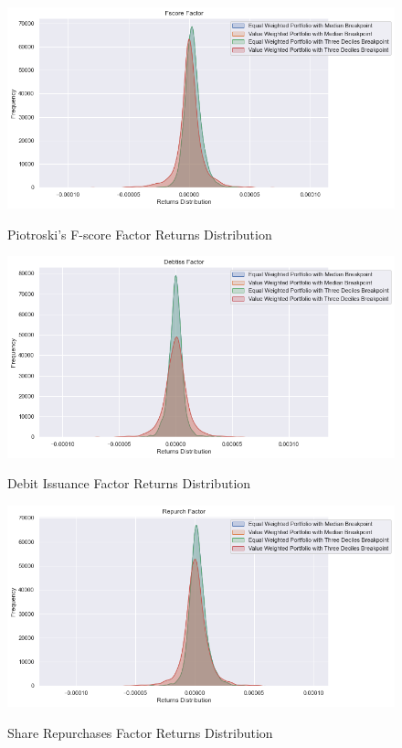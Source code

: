 \begin{figure}[H]
	\caption{Piotroski's F-score Factor Returns Distribution}
	\centering
	\includegraphics[scale=.63]{../../output/figures/fscore.png}
	\label{fig:fscore}
\end{figure}

\begin{figure}[H]
	\caption{Debit Issuance Factor Returns Distribution}
	\centering
	\includegraphics[scale=.63]{../../output/figures/debtiss.png}
	\label{fig:debtiss}
\end{figure}

\begin{figure}[H]
	\caption{Share Repurchases Factor Returns Distribution}
	\centering
	\includegraphics[scale=.63]{../../output/figures/repurch.png}
	\label{fig:repurch}
\end{figure}

